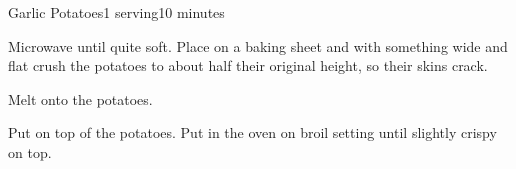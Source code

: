 \documentclass[../Cookbook.tex]{subfiles}
\begin{document}
\begin{recipe}[GarlicPotatoes]{Garlic Potatoes}{1 serving}{10 minutes}

Microwave until quite soft.
Place on a baking sheet and with something wide and flat crush the potatoes to about half their original height, so their skins crack.

Melt onto the potatoes.

Put on top of the potatoes.
Put in the oven on broil setting until slightly crispy on top.


\end{recipe}
\end{document}
